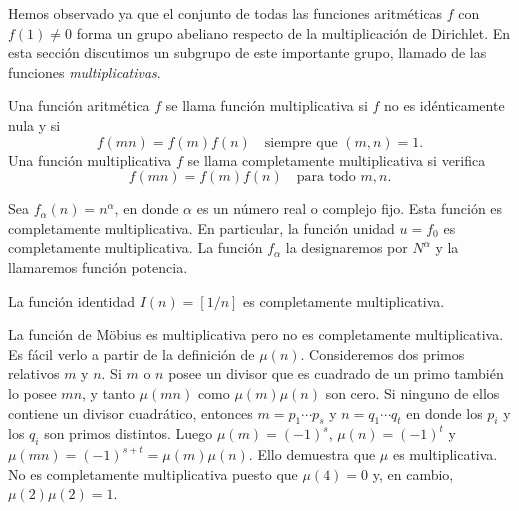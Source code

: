 \documentclass[12pt,a4paper]{book}
\begin{document}
    Hemos observado ya que el conjunto de todas las funciones aritméticas $f$ con
    $f(1)\neq0$ forma un grupo abeliano respecto de la multiplicación de Dirichlet. En esta
    sección discutimos un subgrupo de este importante grupo, llamado de las funciones
    \textit{multiplicativas}.

    \begin{definicion}
        Una función aritmética $f$ se llama función multiplicativa si $f$ no es
        idénticamente nula y si
        \begin{equation*}
            f(mn)=f(m)f(n)\quad\text{siempre que } (m,n)=1.
        \end{equation*}
        Una función multiplicativa $f$ se llama completamente multiplicativa si verifica
        \begin{equation*}
            f(mn)=f(m)f(n)\quad\text{para todo } m,n.
        \end{equation*}
    \end{definicion}

    \begin{ejemplo}
        Sea $f_\alpha(n)=n^\alpha$, en donde $\alpha$ es un número real o complejo fijo.
        Esta función es completamente multiplicativa. En particular, la función unidad
        $u=f_0$ es completamente multiplicativa. La función $f_\alpha$ la designaremos por
        $N^\alpha$ y la llamaremos función potencia.
    \end{ejemplo}

    \begin{ejemplo}
        La función identidad $I(n)=[1/n]$ es completamente multiplicativa.
    \end{ejemplo}

    \begin{ejemplo}
        La función de Möbius es multiplicativa pero no es completamente multiplicativa. Es
        fácil verlo a partir de la definición de $\mu(n)$. Consideremos dos primos
        relativos $m$ y $n$. Si $m$ o $n$ posee un divisor que es cuadrado de un primo
        también lo posee $mn$, y tanto $\mu(mn)$ como $\mu(m)\mu(n)$ son cero. Si ninguno de
        ellos contiene un divisor cuadrático, entonces $m=p_1\cdots p_s$ y $n=q_1\cdots q_t$
        en donde los $p_i$ y los $q_i$ son primos distintos. Luego $\mu(m)=(-1)^s$,
        $\mu(n)=(-1)^t$ y $\mu(mn)=(-1)^{s+t}=\mu(m)\mu(n)$. Ello demuestra que $\mu$ es
        multiplicativa. No es completamente multiplicativa puesto que $\mu(4)=0$ y, en
        cambio, $\mu(2)\mu(2)=1$.
    \end{ejemplo}
\end{document}
